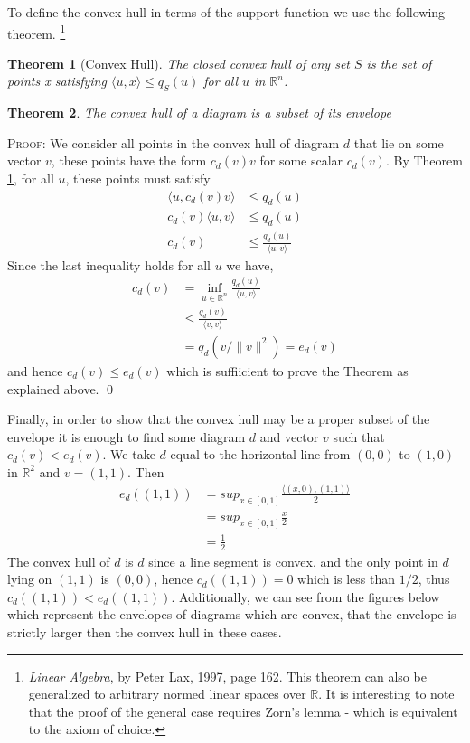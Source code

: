 \documentclass[11pt]{amsart}
\newtheorem{thm}{Theorem}
\begin{document}
  To define the convex hull in terms of the support function we use the following theorem.
  \footnote{\emph{Linear Algebra}, by Peter Lax, 1997, page 162. This theorem can also be generalized to
  arbitrary normed linear spaces over $\mathbb{R}$. It is interesting to note that the proof of the general case requires
  Zorn's lemma - which is equivalent to the axiom of choice.}

  \begin{thm}[Convex Hull]
    \label{convexhull} The closed convex hull of any set $S$ is the set of points x satisfying $\langle u, x \rangle \leq q_S(u)$ for all $u$ in $\mathbb{R}^n$.
  \end{thm}

  \begin{thm}
    The convex hull of a diagram is a subset of its envelope
  \end{thm}
  \textsc{Proof}: We consider all points in the convex hull of diagram $d$ that lie on some vector $v$, these points have the form $c_d(v)v$ for some
  scalar $c_d(v)$. By Theorem \ref{convexhull}, for all $u$, these points must satisfy
  \begin{align}
    \langle u, c_d(v)v \rangle &\leq q_d(u)\\
    c_d(v)\langle u, v \rangle &\leq q_d(u)\\
    c_d(v) &\leq  \frac{q_d(u)}{\langle u, v \rangle}
  \end{align}
  Since the last inequality holds for all $u$ we have,
  \begin{align}
    c_d(v) &= \inf_{u \in \mathbb{R}^n}  \frac{q_d(u)}{\langle u, v \rangle}\\
    &\leq \frac{q_d(v)}{\langle v, v \rangle} \\
    &= q_d(v/\|v\|^2)= e_d(v)
  \end{align}
  and hence $c_d(v) \leq e_d(v)$ which is suffiicient to prove the Theorem as explained above. \qed

  Finally, in order to show that the convex hull may be a proper subset of the envelope it is enough to find some diagram $d$ and vector $v$ such that
  $c_d(v) < e_d(v)$. We take $d$ equal to the horizontal line from $(0,0)$ to $(1,0)$ in $\mathbb{R}^2$ and $v=(1,1)$. Then
  \begin{align}
    e_d((1,1)) &= sup_{x \in [0,1]} \frac{\langle (x,0), (1,1) \rangle}{2}\\
    &= sup_{x \in [0,1]} \frac{x}{2}\\
    &= \frac{1}{2}
  \end{align}
  The convex hull of $d$ is $d$ since a line segment is convex, and the only point in $d$ lying on $(1,1)$ is $(0,0)$, hence $c_d((1,1)) = 0$ which is less than
  $1/2$, thus $c_d((1,1)) < e_d((1,1))$. Additionally, we can see from the figures below which represent the envelopes of diagrams which are convex, that the
  envelope is strictly larger then the convex hull in these cases.
\end{document}
